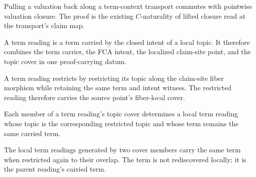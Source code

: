 \begin{theorem}\label{thm:claim-term-valuation-pullback-closure}\leanok{}
Pulling a valuation back along a term-context transport commutes with pointwise
valuation closure.  The proof is the existing \(C\)-naturality of lifted closure
read at the transport's claim map.
\end{theorem}

\begin{proposition}\label{thm:claim-term-reading}\leanok{}
A term reading is a term carried by the closed intent of a local topic.  It
therefore combines the term carrier, the FCA intent, the localized claim-site
point, and the topic cover in one proof-carrying datum.
\end{proposition}

\begin{theorem}\label{thm:claim-term-reading-restrict-cover}\leanok{}
A term reading restricts by restricting its topic along the claim-site fiber
morphism while retaining the same term and intent witness.  The restricted
reading therefore carries the source point's fiber-local cover.
\end{theorem}

\begin{theorem}\label{thm:claim-term-reading-cover-restriction}\leanok{}
Each member of a term reading's topic cover determines a local term reading
whose topic is the corresponding restricted topic and whose term remains the
same carried term.
\end{theorem}

\begin{theorem}\label{thm:claim-term-reading-cover-overlap-terms}\leanok{}
The local term readings generated by two cover members carry the same term when
restricted again to their overlap.  The term is not rediscovered locally; it is
the parent reading's carried term.
\end{theorem}

